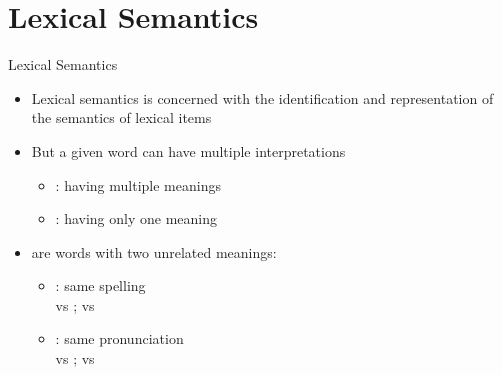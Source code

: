 
\section{Lexical Semantics}

\begin{frame}{Lexical Semantics}

\begin{itemize}
\item Lexical semantics is concerned with the identification and
  representation of the semantics of lexical items
\item But a given word can have multiple interpretations
  \begin{itemize}
  \item {}: having multiple meanings
  \item {}: having only one meaning
  \end{itemize}
\item {} are words with two unrelated meanings:
  \begin{itemize}
  \item {}: same spelling 
    \\  vs ;  vs 
  \item {}: same pronunciation
     \\  vs ;  vs 
  \end{itemize}

\end{itemize}





\end{frame}




